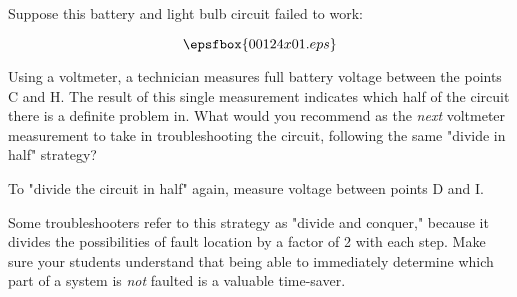 

Suppose this battery and light bulb circuit failed to work:

$$\epsfbox{00124x01.eps}$$

Using a voltmeter, a technician measures full battery voltage between the points C and H.  The result of this single measurement indicates which half of the circuit there is a definite problem in.  What would you recommend as the {\it next} voltmeter measurement to take in troubleshooting the circuit, following the same "divide in half" strategy?







To "divide the circuit in half" again, measure voltage between points D and I.







Some troubleshooters refer to this strategy as "divide and conquer," because it divides the possibilities of fault location by a factor of 2 with each step.  Make sure your students understand that being able to immediately determine which part of a system is {\it not} faulted is a valuable time-saver.




